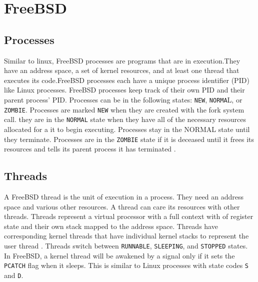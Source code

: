 \section{FreeBSD}
\subsection{Processes}
\noindent
Similar to linux, FreeBSD processes are programs that are in execution.They have an address space, a set of kernel resources, and at least one thread that executes its code.FreeBSD processes  each have a unique process identifier (PID) like Linux processes. FreeBSD processes keep track of their own PID and their parent process' PID. Processes can be in the following states: \lstinline{NEW}, \lstinline{NORMA}L, or \lstinline{ZOMBIE}. Processes are marked \lstinline{NEW} when they are created with the fork system call. they are in the \lstinline{NORMAL} state when they have all of the necessary resources allocated for a it to begin executing. Processes stay in the NORMAL state until they terminate. Processes are in the \lstinline{ZOMBIE} state if it is deceased until it frees its resources and tells its parent process it has terminated \cite{Freebsdtext}. 

\subsection{Threads}
\noindent
A FreeBSD thread is the unit of execution in a process. They need an address space and various other resources. A thread can care its resources with other threads. Threads represent a virtual processor with a full context with of register state and their own stack mapped to the address space\cite{Freebsdtext}. Threads have corresponding kernel threads that have individual kernel stacks to represent the user thread \cite{Freebsdtext}. Threads switch between \lstinline{RUNNABLE}, \lstinline{SLEEPING}, and \lstinline{STOPPED} states. In FreeBSD, a kernel thread will be awakened by a signal only if it sets the \lstinline{PCATCH} flag when it sleeps\cite{Freebsdtext}. This is similar to Linux processes with state codes \lstinline{S} and \lstinline{D}.

